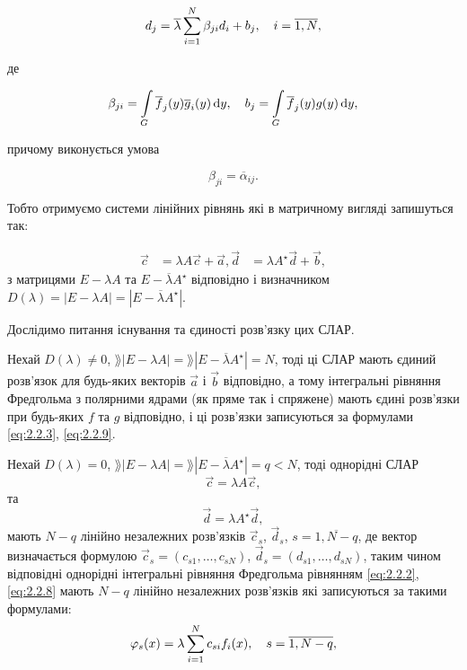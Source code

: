\begin{equation}
	d_j = \overline \lambda \displaystyle\sum\limits_{i = 1}^N \beta_{ji}d_i + b_j, \quad i = \overline{1, N}, 
\end{equation}

де

\begin{equation} 
	\beta_{ji} = \displaystyle\int\limits_G \overline f_j(y) \overline g_i(y) \mathop{}\!\mathrm{d} y, \quad b_j = \displaystyle\int\limits_G \overline f_j(y) g(y) \mathop{}\!\mathrm{d} y,
\end{equation}

причому виконується умова

\begin{equation}
	\beta_{ji} = \overline \alpha_{ij}.
\end{equation}

Тобто отримуємо системи лінійних рівнянь які в матричному вигляді запишуться так:

\begin{align}
	\vec c &= \lambda A \vec c + \vec a,
	\vec d &= \lambda A^\star  \vec d + \vec b,
\end{align}
з матрицями $E - \lambda A$ та $E - \overline \lambda A^\star $ відповідно і визначником $D(\lambda) = |E - \lambda A| = |E - \overline \lambda A^\star |$. \medskip

Дослідимо питання існування та єдиності розв'язку цих СЛАР. \medskip

Нехай $D(\lambda) \ne 0$, $\rang |E - \lambda A| = \rang |E - \overline \lambda A^\star | = N$, тоді ці СЛАР мають єдиний розв'язок для будь-яких векторів $\vec a$ і $\vec b$ відповідно, а тому інтегральні рівняння Фредгольма з полярними ядрами (як пряме так і спряжене) мають єдині розв'язки при будь-яких $f$ та $g$ відповідно, і ці розв'язки записуються за формулами \eqref{eq:2.2.3}, \eqref{eq:2.2.9}. \medskip

Нехай $D(\lambda) = 0$, $\rang |E - \lambda A| = \rang |E - \overline \lambda A^\star | = q < N$, тоді однорідні СЛАР 
\begin{equation}
	\label{eq:2.2.16}
	\vec c = \lambda A \vec c,
\end{equation}
та
\begin{equation}
	\label{eq:2.2.17}
	\vec d = \lambda A^\star  \vec d,
\end{equation}
мають $N - q$ лінійно незалежних розв'язків $\vec c_s$, $\vec d_s$, $s = \overline{1, N - q}$, де вектор визначається формулою $\vec c_s = (c_{s1}, \ldots, c_{sN})$, $\vec d_s = (d_{s1}, \ldots, d_{sN})$, таким чином відповідні однорідні інтегральні рівняння Фредгольма рівнянням \eqref{eq:2.2.2}, \eqref{eq:2.2.8} мають $N - q$ лінійно незалежних розв'язків які записуються за такими формулами:
\begin{equation}
	\label{eq:2.2.18}
	\varphi_s(x) = \lambda \displaystyle\sum\limits_{i = 1}^N c_{si} f_i(x), \quad s = \overline{1, N - q},
\end{equation}

